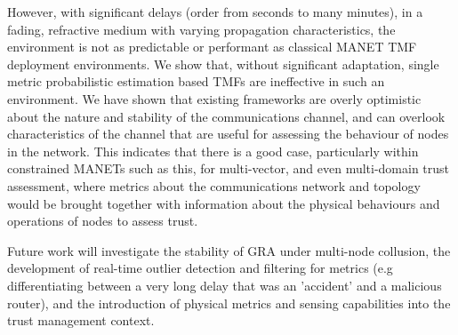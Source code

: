 \documentclass[conference]{IEEEtran}
\providecommand{\DIFaddbegin}{} %
\providecommand{\DIFaddend}{} %
\begin{document}
However, with significant delays (order from seconds to many minutes), in a fading, refractive medium with varying propagation characteristics, the environment is not as predictable or performant as classical MANET TMF deployment environments.
We show that, without significant adaptation, single metric probabilistic estimation based TMFs are ineffective in such an environment.
We have shown that existing frameworks are overly optimistic about the nature and stability of the communications channel, and can overlook characteristics of the channel that are useful for assessing the behaviour of nodes in the network. 
This indicates that there is a good case, particularly within constrained MANETs such as this, for multi-vector, and even multi-domain trust assessment, where metrics about the communications network and topology would be brought together with information about the physical behaviours and operations of nodes to assess trust.

Future work will investigate the stability of GRA under multi-node collusion, the development of real-time outlier detection and filtering for metrics (e.g differentiating between a very long delay that was an 'accident' and a malicious router), and the introduction of physical metrics and sensing capabilities into the trust management context.
\DIFaddbegin {}
\DIFaddend 


%
%

\end{document}

